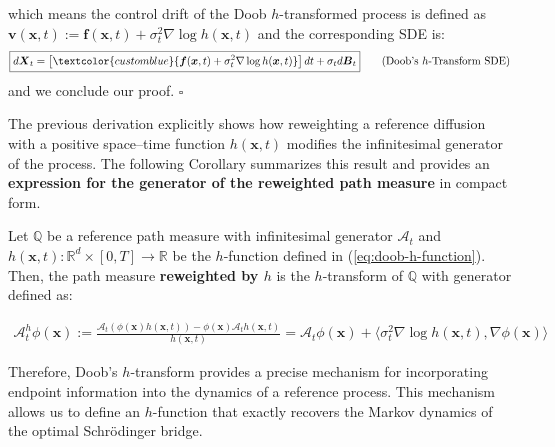 \documentclass{article}
\newcommand{\bluetext}[1]{\textcolor{customblue}{#1}}
\begin{document}
which means the control drift of the Doob $h$-transformed process is defined as $\boldsymbol{v}(\boldsymbol{x},t) :=\boldsymbol{f}(\boldsymbol{x},t)+\sigma_t^2\nabla \log h(\boldsymbol{x},t)$ and the corresponding SDE is:
\begin{align}
    \boxed{d\boldsymbol{X}_t=\left[\bluetext{\boldsymbol{f}(\boldsymbol{x},t)+\sigma_t^2\nabla \log h (\boldsymbol{x},t)}\right]dt+\sigma_td\boldsymbol{B}_t}\tag{Doob's $h$-Transform SDE}
\end{align}
and we conclude our proof. \hfill $\square$

The previous derivation explicitly shows how reweighting a reference diffusion with a positive space–time function $h(\boldsymbol{x},t)$ modifies the infinitesimal generator of the process. The following Corollary summarizes this result and provides an \textbf{expression for the generator of the reweighted path measure} in compact form.

\begin{corollary}\label{lemma:generator-reweighted}
    Let $\mathbb{Q}$ be a reference path measure with infinitesimal generator $\mathcal{A}_t$ and $h(\boldsymbol{x},t):\mathbb{R}^d\times[0,T]\to \mathbb{R}$ be the $h$-function defined in (\ref{eq:doob-h-function}). Then, the path measure \textbf{reweighted by $h$} is the $h$-transform of $\mathbb{Q}$ with generator defined as:
    \begin{small}
    \begin{align}
        \mathcal{A}_t^h\phi(\boldsymbol{x}):=\frac{\mathcal{A}_t(\phi(\boldsymbol{x}) h(\boldsymbol{x},t))-\phi(\boldsymbol{x})\mathcal{A}_th(\boldsymbol{x},t)}{h(\boldsymbol{x},t)}=\mathcal{A}_t\phi(\boldsymbol{x})+\langle \sigma_t^2\nabla \log h(\boldsymbol{x},t), \nabla \phi(\boldsymbol{x})\rangle
    \end{align}
    \end{small}
    
\end{corollary}

Therefore, Doob's $h$-transform provides a precise mechanism for incorporating endpoint information into the dynamics of a reference process. This mechanism allows us to define an $h$-function that exactly recovers the Markov dynamics of the optimal Schrödinger bridge.
\end{document}
